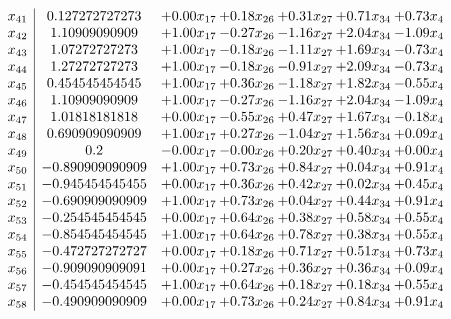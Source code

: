 \documentclass[8pt]{article}
\begin{document}
\[\begin{array}{c| c c@{\hskip 2pt} c@{\hskip 2pt} c@{\hskip 2pt} c@{\hskip 2pt} c@{\hskip 2pt} }
 x_{41}   &  0.127272727273 & +  0.00 x_{17} & +  0.18 x_{26} & +  0.31 x_{27} & +  0.71 x_{34} & +  0.73 x_{4}\\
 x_{42}   &  1.10909090909 & +  1.00 x_{17} & -0.27 x_{26} & -1.16 x_{27} & +  2.04 x_{34} & -1.09 x_{4}\\
 x_{43}   &  1.07272727273 & +  1.00 x_{17} & -0.18 x_{26} & -1.11 x_{27} & +  1.69 x_{34} & -0.73 x_{4}\\
 x_{44}   &  1.27272727273 & +  1.00 x_{17} & -0.18 x_{26} & -0.91 x_{27} & +  2.09 x_{34} & -0.73 x_{4}\\
 x_{45}   &  0.454545454545 & +  1.00 x_{17} & +  0.36 x_{26} & -1.18 x_{27} & +  1.82 x_{34} & -0.55 x_{4}\\
 x_{46}   &  1.10909090909 & +  1.00 x_{17} & -0.27 x_{26} & -1.16 x_{27} & +  2.04 x_{34} & -1.09 x_{4}\\
 x_{47}   &  1.01818181818 & +  0.00 x_{17} & -0.55 x_{26} & +  0.47 x_{27} & +  1.67 x_{34} & -0.18 x_{4}\\
 x_{48}   &  0.690909090909 & +  1.00 x_{17} & +  0.27 x_{26} & -1.04 x_{27} & +  1.56 x_{34} & +  0.09 x_{4}\\
 x_{49}   &  0.2 & -0.00 x_{17} & -0.00 x_{26} & +  0.20 x_{27} & +  0.40 x_{34} & +  0.00 x_{4}\\
 x_{50}   &  -0.890909090909 & +  1.00 x_{17} & +  0.73 x_{26} & +  0.84 x_{27} & +  0.04 x_{34} & +  0.91 x_{4}\\
 x_{51}   &  -0.945454545455 & +  0.00 x_{17} & +  0.36 x_{26} & +  0.42 x_{27} & +  0.02 x_{34} & +  0.45 x_{4}\\
 x_{52}   &  -0.690909090909 & +  1.00 x_{17} & +  0.73 x_{26} & +  0.04 x_{27} & +  0.44 x_{34} & +  0.91 x_{4}\\
 x_{53}   &  -0.254545454545 & +  0.00 x_{17} & +  0.64 x_{26} & +  0.38 x_{27} & +  0.58 x_{34} & +  0.55 x_{4}\\
 x_{54}   &  -0.854545454545 & +  1.00 x_{17} & +  0.64 x_{26} & +  0.78 x_{27} & +  0.38 x_{34} & +  0.55 x_{4}\\
 x_{55}   &  -0.472727272727 & +  0.00 x_{17} & +  0.18 x_{26} & +  0.71 x_{27} & +  0.51 x_{34} & +  0.73 x_{4}\\
 x_{56}   &  -0.909090909091 & +  0.00 x_{17} & +  0.27 x_{26} & +  0.36 x_{27} & +  0.36 x_{34} & +  0.09 x_{4}\\
 x_{57}   &  -0.454545454545 & +  1.00 x_{17} & +  0.64 x_{26} & +  0.18 x_{27} & +  0.18 x_{34} & +  0.55 x_{4}\\
 x_{58}   &  -0.490909090909 & +  0.00 x_{17} & +  0.73 x_{26} & +  0.24 x_{27} & +  0.84 x_{34} & +  0.91 x_{4}\\

\end{array}\]
\end{document}
